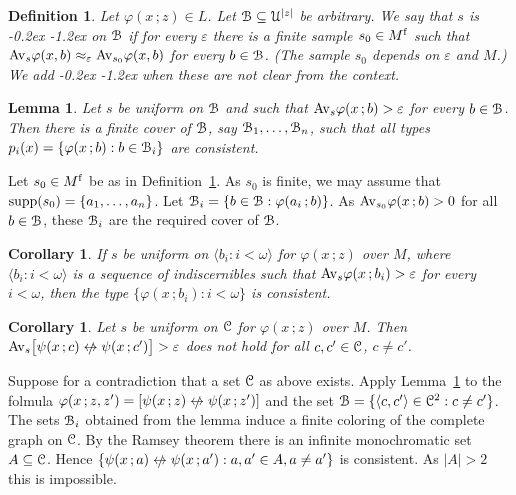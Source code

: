\documentclass[10pt,openany]{article}
\def\supp{\mathop{\rm supp}}
\def\niff{\mathrel{{\leftrightarrow}\llap{\raisebox{-.1ex}{{\small$/$}}\hskip.5ex}}}
\def\C{\EuScript C}
\def\U{\EuScript U}
\def\B{\EuScript B}
\def\<{\langle}
\def\>{\rangle}
\def\phi{\varphi}
\def\epsilon{\varepsilon}
\newcounter{thm}[section]
\theoremstyle{mio}
\newtheorem{corollary}[thm]{Corollary}
\newtheorem{lemma}[thm]{Lemma}
\newtheorem{definition}[thm]{Definition}
\theoremstyle{liscio}
\def\QED{\noindent\nolinebreak[4]\hspace{\stretch{1}}\rlap{\ \ $\Box$}\medskip}
\renewenvironment{proof}[1][Proof]%
{\begin{trivlist}\item[\hskip\labelsep {\bf #1}]}
{\QED\end{trivlist}}
\renewcommand*{\emph}[1]{%
   \kern-0.2ex 
   \smash{\tikz[baseline]
   \node[ rectangle, fill=emphcolor, rounded corners, 
          inner xsep=.3ex, inner ysep=.2ex, anchor=base,
          minimum height = 3ex
         ]{#1};
   }
   \kern-1.2ex 
}
\begin{document}
\begin{definition}\label{def_uniform_sample}
  Let $\phi(x\,;z)\in L$.
  Let $\B\subseteq\U^{|z|}$ be arbitrary.
  We say that $s$ is \emph{uniform\/} on $\B$ if for every $\epsilon$ there is a finite sample $s_0\in M^{\rm f}$ such that $\Av_s\phi(x,b)\approx_\epsilon\Av_{s_0}\phi(x,b)$ for every $b\in\B$. (The sample $s_0$ depends on $\epsilon$ and $M$.) We add \emph{for $\phi(x\,;z)$ over $M$\/} when these are not clear from the context.\QED
\end{definition}


\begin{lemma}\label{lem_cons}
  Let $s$ be uniform on $\B$ and such that $\Av_s\phi(x\,;b)>\epsilon$ for every $b\in\B$. Then there is a finite cover of $\B$, say $\B_1,\dots,\B_n$, such that all types $p_i(x)=\{\phi(x\,;b):b\in\B_i\}$ are consistent.
\end{lemma}

\begin{proof}
  Let $s_0\in M^{\rm f}$ be as in Definition~\ref{def_uniform_sample}.
  As $s_0$ is finite, we may assume that $\supp(s_0)=\{a_1,\dots,a_n\}$.
  Let $\B_i=\{b\in\B:\phi(a_i\,;b)\}$.
  As $\Av_{s_0}\phi(x\,;b)>0$ for all $b\in\B$, these $\B_i$ are the required cover of $\B$.
\end{proof}

\begin{corollary}
  If $s$ be uniform on $\<b_i:i<\omega\>$ for $\phi(x\,;z)$ over $M$, where $\<b_i:i<\omega\>$ is a sequence of indiscernibles such that $\Av_s\phi(x\,;b_i)>\epsilon$ for every $i<\omega$, then the type $\{\phi(x\,;b_i):i<\omega\}$ is consistent.\QED
\end{corollary}

\begin{corollary}
  Let $s$ be uniform on $\C$ for $\phi(x\,;z)$ over $M$.
  Then $\Av_s\big[\psi(x\,;c)\niff\psi(x\,;c')\big]>\epsilon$ does not hold for all $c,c'\in\C$, $c\neq c'$.
\end{corollary}

\begin{proof}
  Suppose for a contradiction that a set $\C$ as above exists. Apply Lemma~\ref{lem_cons} to the folmula $\phi(x\,;z,z') = [\psi(x\,;z)\niff\psi(x\,;z')]$ and the set $\B=\{\<c,c'\>\in\C^2:c\neq c'\}$.
 The sets $\B_i$ obtained from the lemma induce a finite coloring of the complete graph on $\C$.
 By the Ramsey theorem there is an infinite monochromatic set $A\subseteq\C$.
 Hence $\{\psi(x\,;a)\niff\psi(x\,;a') : a,a'\in A, a\neq a'\}$ is consistent.
 As $|A|>2$ this is impossible.
\end{proof}
\end{document}
